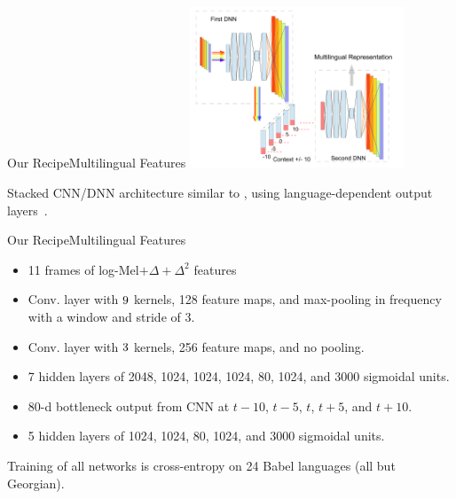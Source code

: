 \begin{frame}{Our Recipe}{Multilingual Features}
  \centering
  \includegraphics[height=48mm]{figures/mldnn}
  \vfill
  \raggedright
  Stacked CNN/DNN architecture similar to \cite{Grezl2009}, using
  language-dependent output layers~\cite{Scanzio2008}.
  \vfill
\end{frame}

\begin{frame}{Our Recipe}{Multilingual Features}
  \begin{description}[CNN]
    \item[CNN]
      \begin{itemize}
      \item 11 frames of log-Mel$+\Delta+\Delta^{2}$ features
      \item Conv. layer with $9 \time 9$ kernels, 128 feature maps,
        and max-pooling in frequency with a window and stride of 3.
      \item Conv. layer with $3 \time 4$ kernels, 256 feature maps,
        and no pooling.
      \item 7 hidden layers of 2048, 1024, 1024, 1024, \alert{80},
        1024, and 3000 sigmoidal units.
      \end{itemize}
    \item[DNN]
      \begin{itemize}
      \item 80-d bottleneck output from CNN at $t-10$, $t-5$, $t$,
        $t+5$, and $t+10$.
      \item 5 hidden layers of 1024, 1024, \alert{80}, 1024, and 3000
        sigmoidal units.
      \end{itemize}
  \end{description}
  \vfill
  Training of all networks is cross-entropy on 24 Babel languages (all
  but Georgian).
\end{frame}

